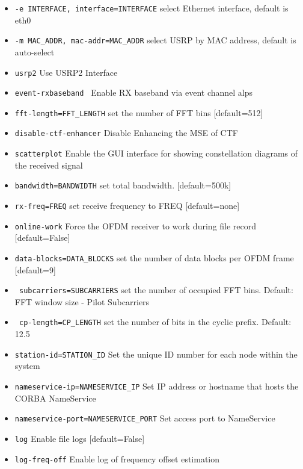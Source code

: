 \begin{enumerate}
\begin{itemize}
  		\item  \texttt{-e INTERFACE, \option interface=INTERFACE} select Ethernet interface, default is eth0
  		\item  \texttt{-m MAC\_ADDR, \option mac-addr=MAC\_ADDR} select USRP by MAC address, default is auto-select
  		\item  \texttt{\option usrp2}               Use USRP2 Interface
  		\item  \texttt{\option event-rxbaseband }   Enable RX baseband via event channel alps
  		\item  \texttt{\option fft-length=FFT\_LENGTH} set the number of FFT bins [default=512]
  		\item  \texttt{\option disable-ctf-enhancer}  Disable Enhancing the MSE of CTF
  		\item  \texttt{\option scatterplot}         Enable the GUI interface for showing constellation diagrams of the received signal
  		\item  \texttt{\option bandwidth=BANDWIDTH} set total bandwidth. [default=500k]
   		\item  \texttt{\option rx-freq=FREQ}      set receive frequency to FREQ [default=none]
   		\item  \texttt{\option online-work}       Force the OFDM receiver to work during file record [default=False]
    		\item  \texttt{\option data-blocks=DATA\_BLOCKS} set the number of data blocks per OFDM frame [default=9]
    		\item \texttt{ \option subcarriers=SUBCARRIERS} set the number of occupied FFT bins. Default: FFT window size - Pilot Subcarriers
   		\item \texttt{ \option cp-length=CP\_LENGTH} set the number of bits in the cyclic prefix. Default: 12.5%
   		\item  \texttt{\option station-id=STATION\_ID} Set the unique ID number for each node within the system
   		\item  \texttt{\option nameservice-ip=NAMESERVICE\_IP} Set IP address or hostname that hosts the CORBA NameService
   		\item  \texttt{\option nameservice-port=NAMESERVICE\_PORT} Set access port to NameService
   		\item  \texttt{\option log}               Enable file logs [default=False]
		\item  \texttt{\option log-freq-off}	Enable log of frequency offset estimation

\end{itemize}
\end{enumerate}
